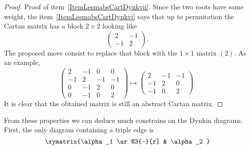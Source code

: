 \begin{proof}
    Proof of item~\ref{ItemLesmabsCartDynkvii}. Since the two roots have same weight, the item~\ref{ItemLesmabsCartDynkvi} says that up to permutation the Cartan matrix has a block \( 2\times 2\) looking like
    \begin{equation}
        \begin{pmatrix}
            2    &   -1    \\
            -1    &   2
        \end{pmatrix}.
    \end{equation}
    The proposed move consist to replace that block with the \( 1\times 1\) matrix \( (2)\). As an example,
    \begin{equation}
        \begin{pmatrix}
             2   &   -1    &   0    &   0    \\
             -1   &   2    &   -1    &   -1    \\
             0   &   -1    &   2    &   0    \\
             0   &   -1    &   0    &   2
         \end{pmatrix}\mapsto
         \begin{pmatrix}
             2   &   -1    &   -1    \\
             -1   &   2    &   0    \\
             -1   &   0    &   2
         \end{pmatrix}.
    \end{equation}
    It is clear that the obtained matrix is still an abstract Cartan matrix.
\end{proof}

From these properties we can deduce much constrains on the Dynkin diagrams. First, the only diagram containing a triple edge is
\begin{equation}
    \xymatrix{%
    \alpha_1 \ar@3{-}[r]        &   \alpha_2
       }
\end{equation}

